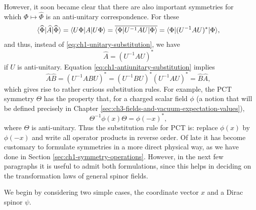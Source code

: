 However, it soon became clear that there are also important symmetries for
which $\Phi\longmapsto\widehat\Phi$ is an anti-unitary correspondence. For
these
\[
  \langle \widehat\Phi\rvert\widehat A\lvert \widehat\Phi\rangle
  =\langle U\Phi\rvert A\lvert U\Phi\rangle
  =\overline{\langle \Phi\rvert U^{-1}AU\lvert \Phi\rangle}
  =\langle \Phi\rvert(U^{-1}AU)^*\lvert \Phi\rangle,
\]
and thus, instead of \eqref{eq:ch1-unitary-substitution}, we have
\begin{equation}
  \widehat A=(U^{-1}AU)^*
  \tag{1-30}\label{eq:ch1-antiunitary-substitution}
\end{equation}
if $U$ is anti-unitary. Equation \eqref{eq:ch1-antiunitary-substitution} implies
\begin{equation}
  \widehat A\widehat B
  =(U^{-1}ABU)^*
  =(U^{-1}BU)^*(U^{-1}AU)^*
  =\widehat B\widehat A,
  \tag{1-31}\label{eq:ch1-antiunitary-reversal}
\end{equation}
which gives rise to rather curious substitution rules. For example, the
$\mathrm{PCT}$ symmetry $\Theta$ has the property that, for a charged scalar
field $\phi$ (a notion that will be defined precisely in Chapter \ref{sec:ch3-fields-and-vacuum-expectation-values}),
\begin{equation}
  \Theta^{-1}\phi(x)\Theta=\phi(-x)^*,
  \tag{1-32}\label{eq:ch1-pct-scalar}
\end{equation}
where $\Theta$ is anti-unitary. Thus the substitution rule for $\mathrm{PCT}$
is: replace $\phi(x)$ by $\phi(-x)$ and write all operator products in reverse
order. Of late it has become customary to formulate symmetries in a more
direct physical way, as we have done in Section \ref{sec:ch1-symmetry-operations}. However, in the next few
paragraphs it is useful to admit both formulations, since this helps in
deciding on the transformation laws of general spinor fields.

We begin by considering two simple cases, the coordinate vector $x$ and a
Dirac spinor $\psi$.

